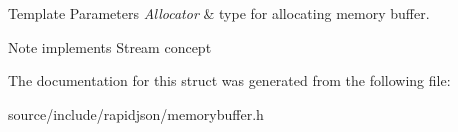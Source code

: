 \begin{DoxyTemplParams}{Template Parameters}
{\em Allocator} & type for allocating memory buffer. \\
\hline
\end{DoxyTemplParams}
\begin{DoxyNote}{Note}
implements Stream concept 
\end{DoxyNote}


The documentation for this struct was generated from the following file\+:\begin{DoxyCompactItemize}
\item 
source/include/rapidjson/memorybuffer.\+h\end{DoxyCompactItemize}
